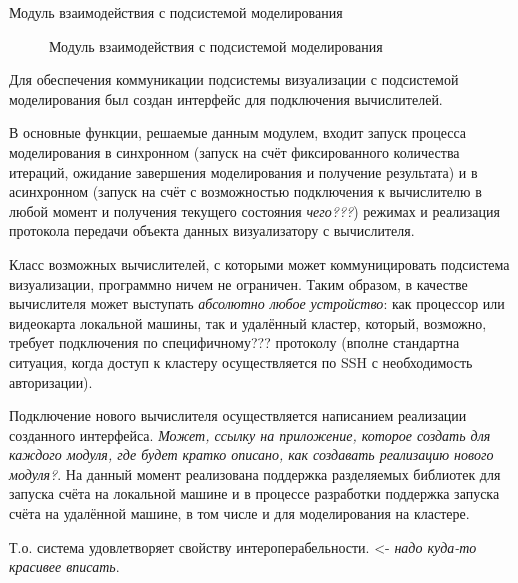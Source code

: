 \documentclass[a4paper,12pt]{extarticle}
\begin{document}
\begin{subsection}{Модуль взаимодействия с подсистемой моделирования}
    \begin{figure}[h]
        \caption{Модуль взаимодействия с подсистемой моделирования}
        \label{ris:architecture-calc}
    \end{figure}
    
    Для обеспечения коммуникации подсистемы визуализации с подсистемой моделирования был создан интерфейс для подключения вычислителей.

    В основные функции, решаемые данным модулем, входит запуск процесса моделирования в синхронном (запуск на счёт фиксированного количества итераций, ожидание завершения моделирования и получение результата) и в асинхронном (запуск на счёт с возможностью подключения к вычислителю в любой момент и получения текущего состояния \textit{чего???}) режимах и реализация протокола передачи объекта данных визуализатору с вычислителя.

    Класс возможных вычислителей, с которыми может коммуницировать подсистема визуализации, программно ничем не ограничен. Таким образом, в качестве вычислителя может выступать \textit{абсолютно любое устройство}: как процессор или видеокарта локальной машины, так и удалённый кластер, который, возможно, требует подключения по специфичному??? протоколу (вполне стандартна ситуация, когда доступ к кластеру осуществляется по SSH с необходимость авторизации).

    Подключение нового вычислителя осуществляется написанием реализации созданного интерфейса.
    \textit{Может, ссылку на приложение, которое создать для каждого модуля, где будет кратко описано, как создавать реализацию нового модуля?}. На данный момент реализована поддержка разделяемых библиотек для запуска счёта на локальной машине и в процессе разработки поддержка запуска счёта на удалённой машине, в том числе и для моделирования на кластере.

    Т.о. система удовлетворяет свойству интероперабельности. <- \textit{надо куда-то красивее вписать}.
\end{subsection}
\end{document}

